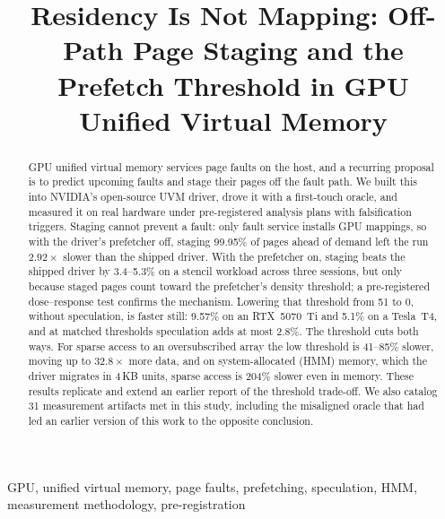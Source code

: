
\title{Residency Is Not Mapping: Off-Path Page Staging and the Prefetch
Threshold in GPU Unified Virtual Memory}

\begin{abstract}
GPU unified virtual memory services page faults on the host, and a recurring
proposal is to predict upcoming faults and stage their pages off the fault path.
We built this into NVIDIA's open-source UVM driver, drove it with a first-touch
oracle, and measured it on real hardware under pre-registered analysis plans
with falsification triggers. Staging cannot prevent a fault: only fault service
installs GPU mappings, so with the driver's prefetcher off, staging 99.95\% of
pages ahead of demand left the run $2.92\times$ slower than the shipped driver.
With the prefetcher on, staging beats the shipped driver by 3.4--5.3\% on a
stencil workload across three sessions, but only because staged pages count
toward the prefetcher's density threshold; a pre-registered dose--response test
confirms the mechanism. Lowering that threshold from 51 to 0, without
speculation, is faster still: 9.57\% on an RTX~5070~Ti and 5.1\% on a Tesla~T4,
and at matched thresholds speculation adds at most 2.8\%. The threshold cuts
both ways. For sparse access to an oversubscribed array the low threshold is
41--85\% slower, moving up to $32.8\times$ more data, and on system-allocated
(HMM) memory, which the driver migrates in 4\,KB units, sparse access is 204\%
slower even in memory. These results replicate and extend an earlier report of
the threshold trade-off. We also catalog 31 measurement artifacts met in this
study, including the misaligned oracle that had led an earlier version of this
work to the opposite conclusion.
\end{abstract}

\begin{IEEEkeywords}
GPU, unified virtual memory, page faults, prefetching, speculation, HMM,
measurement methodology, pre-registration
\end{IEEEkeywords}
